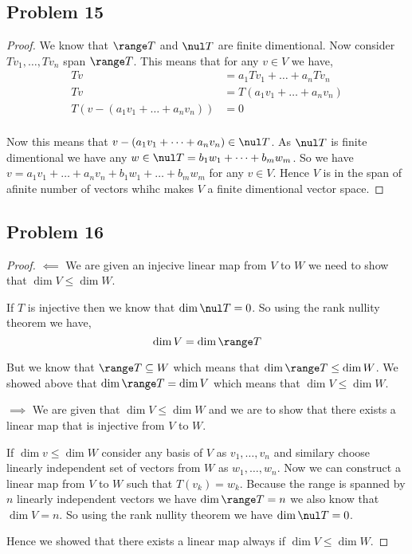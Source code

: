 \documentclass[a4paper]{report}
\begin{document}
\subsection*{Problem 15}
\begin{proof}
    We know that $\range T$ and $\nul T$ are finite dimentional. Now consider $Tv_1,\dots,Tv_n$ span $\range T$. This means that for any  $v \in V$ we have, 
    \begin{align*}
        Tv &= a_1Tv_1 + \dots + a_nTv_n\\
         Tv &= T(a_1v_1 + \dots + a_nv_n)\\
         T(v - (a_1v_1 + \dots + a_nv_n)) &= 0\\
    \end{align*}

    Now this means that $v - (a_1v_1 + \dots + a_nv_n) \in \nul T$. As $\nul T$ is finite dimentional we have any $w \in \nul T = b_1w_1 + \dots + b_mw_m$. So we have $v = a_1v_1 + \dots + a_nv_n + b_1w_1 + \dots + b_mw_m$ for any  $v \in V$.  Hence $V$ is in the span of  afinite number of vectors whihc makes $V$ a finite dimentional vector space.
\end{proof}

\subsection*{Problem 16}
\begin{proof}
    $\impliedby$
    We are given an injecive linear map from $V$ to $W$ we need to show that $\dim V \le \dim W$.

    If $T$ is injective then we know that $\dim \nul T = 0$. So using the rank nullity theorem we have, 
    $$ \dim V = \dim \range T $$

    But we know that $\range T \subseteq W$ which means that  $\dim \range T \le \dim W$. We showed above that $\dim \range T = \dim V$ which means that $\dim V \le \dim W$.
 
    $\implies$
    We are given that $\dim V \le \dim W$ and we are to show that there exists a linear map that is injective from $V$ to $W$.

    If $\dim v \le \dim W$ consider any basis of $V$ as $v_1,\dots,v_n$ and similary choose linearly independent set of vectors from $W$ as $w_1,\dots,w_n$. Now we can construct a linear map from $V$ to $W$ such that $T(v_k) = w_k$. Because the range is spanned by $n$ linearly independent vectors we have $\dim \range T = n$ we also know that $\dim V = n$. So using the rank nullity theorem we have $\dim \nul T = 0$. 

    Hence we showed that there exists a linear map always if  $\dim V \le \dim W$.
\end{proof}
\end{document}
